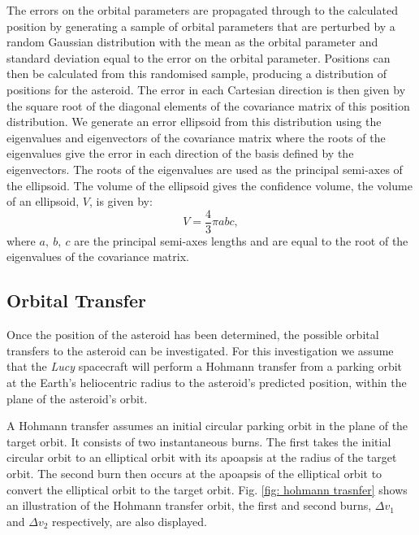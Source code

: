 \documentclass[10pt, twocolumn]{revtex4}    %
\begin{document}
The errors on the orbital parameters are propagated through to the calculated position by generating a sample of orbital parameters that are perturbed by a random Gaussian distribution with the mean as the orbital parameter and standard deviation equal to the error on the orbital parameter. Positions can then be calculated from this randomised sample, producing a distribution of positions for the asteroid. The error in each Cartesian direction is then given by the square root of the diagonal elements of the covariance matrix of this position distribution. We generate an error ellipsoid from this distribution using the eigenvalues and eigenvectors of the covariance matrix where the roots of the eigenvalues give the error in each direction of the basis defined by the eigenvectors. The roots of the eigenvalues are used as the principal semi-axes of the ellipsoid. The volume of the ellipsoid gives the confidence volume, the volume of an ellipsoid, $V$, is given by:
\begin{equation} \label{eq: v ellipsoid}
V = \frac{4}{3}\pi a b c ,
\end{equation}
where $a,\ b,\ c$ are the principal semi-axes lengths and are equal to the root of the eigenvalues of the covariance matrix.

\subsection*{Orbital Transfer}

Once the position of the asteroid has been determined, the possible orbital transfers to the asteroid can be investigated. For this investigation we assume that the \textit{Lucy} spacecraft will perform a Hohmann transfer from a parking orbit at the Earth's heliocentric radius to the asteroid's predicted position, within the plane of the asteroid's orbit. 

A Hohmann transfer assumes an initial circular parking orbit in the plane of the target orbit. It consists of two instantaneous burns. The first takes the initial circular orbit to an elliptical orbit with its apoapsis at the radius of the target orbit. The second burn then occurs at the apoapsis of the elliptical orbit to convert the elliptical orbit to the target orbit. Fig. \ref{fig: hohmann trasnfer} shows an illustration of the Hohmann transfer orbit, the first and second burns, $\Delta v_1$ and $\Delta v_2$ respectively, are also displayed.
\end{document}
